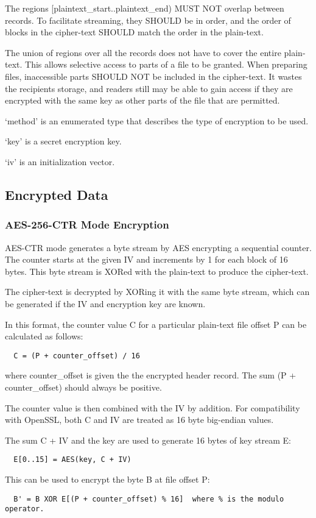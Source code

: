 \documentclass[10pt]{article}
\begin{document}
The regions [plaintext\_start..plaintext\_end) MUST NOT overlap between records.
To facilitate streaming, they SHOULD be in order, and the order of blocks in the cipher-text SHOULD match the order
in the plain-text.

The union of regions over all the records does not have to cover the entire plain-text.
This allows selective access to parts of a file to be granted.
When preparing files, inaccessible parts SHOULD NOT be included in the cipher-text.
It wastes the recipients storage, and readers still may be able to gain access if they are encrypted with the same key
as other parts of the file that are permitted.

`method' is an enumerated type that describes the type of encryption to be used.

`key' is a secret encryption key.

`iv' is an initialization vector.

\subsection{Encrypted Data}
\subsubsection{AES-256-CTR Mode Encryption}

AES-CTR mode generates a byte stream by AES encrypting a sequential counter.
The counter starts at the given IV and increments by 1 for each block of 16 bytes.
This byte stream is XORed with the plain-text to produce the cipher-text.

The cipher-text is decrypted by XORing it with the same byte stream, which can be generated if the IV and encryption
key are known.

In this format, the counter value C for a particular plain-text file offset P can be calculated as follows:
\begin{verbatim}
  C = (P + counter_offset) / 16
\end{verbatim}
where counter\_offset is given the the encrypted header record.
The sum (P + counter\_offset) should always be positive.

The counter value is then combined with the IV by addition.
For compatibility with OpenSSL, both C and IV are treated as 16 byte big-endian values.

The sum C + IV and the key are used to generate 16 bytes of key stream E:
\begin{verbatim}
  E[0..15] = AES(key, C + IV)
\end{verbatim}
  This can be used to encrypt the byte B at file offset P:
\begin{verbatim}
  B' = B XOR E[(P + counter_offset) % 16]  where % is the modulo operator.
\end{verbatim}
\end{document}
